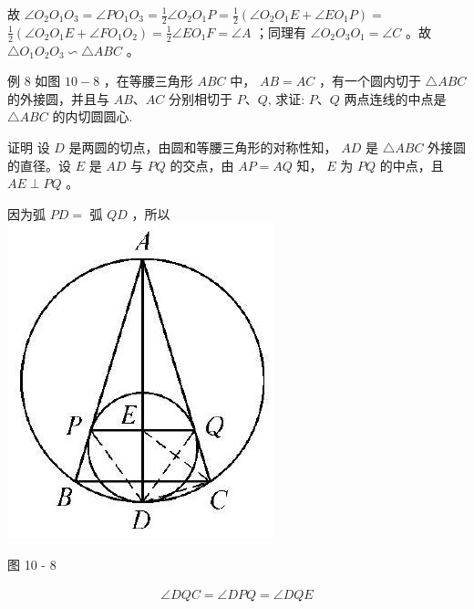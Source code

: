 \documentclass[10pt]{article}
\begin{document}
故 $\angle O_{2} O_{1} O_{3}=\angle P O_{1} O_{3}=\frac{1}{2} \angle O_{2} O_{1} P=\frac{1}{2}\left(\angle O_{2} O_{1} E+\angle E O_{1} P\right)=$ $\frac{1}{2}\left(\angle O_{2} O_{1} E+\angle F O_{1} O_{2}\right)=\frac{1}{2} \angle E O_{1} F=\angle A$ ；同理有 $\angle O_{2} O_{3} O_{1}=\angle C$ 。故 $\triangle O_{1} O_{2} O_{3} \backsim \triangle A B C$ 。

例 8 如图 $10-8$ ，在等腰三角形 $A B C$ 中， $A B=A C$ ，有一个圆内切于 $\triangle A B C$ 的外接圆，并且与 $A B 、 A C$ 分别相切于 $P 、 Q$, 求证: $P 、 Q$ 两点连线的中点是 $\triangle A B C$ 的内切圆圆心.

证明 设 $D$ 是两圆的切点，由圆和等腰三角形的对称性知， $A D$ 是 $\triangle A B C$ 外接圆的直径。设 $E$ 是 $A D$ 与 $P Q$ 的交点，由 $A P=A Q$ 知， $E$ 为 $P Q$ 的中点，且 $A E \perp P Q$ 。

因为弧 $P D=$ 弧 $Q D$ ，所以\\
\includegraphics[max width=\textwidth, center]{2024_10_30_66b8e5e701da2093c133g-075}

图 10 - 8

\begin{align*}
\angle D Q C=\angle D P Q=\angle D Q E
\end{align*}
\end{document}
